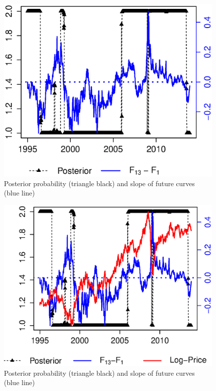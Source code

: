 \begin{figure}
	\centering
	\includegraphics[scale=.6]{Posterior_Data.eps}
	\caption{Posterior probability (triangle black) and slope of future curves (blue line)}
	\label{fig:posterior:data}
\end{figure}

\begin{figure}
	\centering
	\includegraphics[scale=.75]{Posterior_Data_LogPrice.eps}
	\caption{Posterior probability (triangle black) and slope of future curves (blue line)}
	\label{fig:posterior:data:logprice}
\end{figure}



